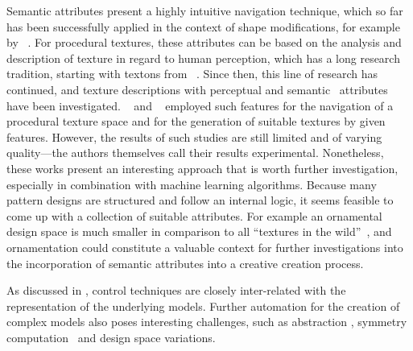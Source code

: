 Semantic attributes present a highly intuitive navigation technique, which so far has been successfully applied in the context of shape modifications, for example by \citeauthor*{yumer_2015_sse}~\cite{yumer_2015_sse}. For procedural textures, these attributes can be based on the analysis and description of texture in regard to human perception, which has a long research tradition, starting with textons from \citeauthor*{julesz_1981_tte}~\cite{julesz_1981_tte}. 
Since then, this line of research has continued, and texture descriptions with perceptual \cite{liu_2015_vpp} and semantic~\cite{matthews_2013_eta,cimpoi_2014_dtw} attributes have been investigated. \citeauthor*{dong_2017_ptg}~\cite{dong_2017_ptg} and \citeauthor*{liu_2018_ppt}~\cite{liu_2018_ppt} employed such features for the navigation of a procedural texture space and for the generation of suitable textures by given features. However, the results of such studies are still limited and of varying quality---the authors themselves \cite{liu_2018_ppt} call their results experimental. Nonetheless, these works present an interesting approach that is worth further investigation, especially in combination with machine learning algorithms. Because many pattern designs are structured and follow an internal logic, it seems feasible to come up with a collection of suitable attributes. For example an ornamental design space is much smaller in comparison to all ``textures in the wild''~\cite{cimpoi_2014_dtw}, and ornamentation could constitute a valuable context for further investigations into the incorporation of semantic attributes into a creative creation process.

As discussed in , control techniques are closely inter-related with the representation of the underlying models. 
Further automation for the creation of complex models also poses interesting challenges, such as abstraction \cite{nan_2011_cgr}, symmetry computation~\cite{cullen_2011_sh} and design space variations.